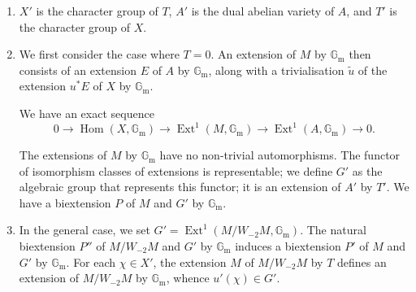     
 \begin{enumerate}
      
 \item[(a)]
        \(X'\) is the character group of \(T\), \(A'\) is the dual abelian variety of \(A\), and \(T'\) is the character group of \(X\).
      


      
 \item[(b)]
        We first consider the case where \(T=0\).
        An extension of \(M\) by \(\mathbb {G}_\mathrm {m}\) then consists of an extension \(E\) of \(A\) by \(\mathbb {G}_\mathrm {m}\), along with a trivialisation \(\widetilde {u}\) of the extension \(u^*E\) of \(X\) by \(\mathbb {G}_\mathrm {m}\).

        


        We have an exact sequence
        \[           0           \to  \operatorname {Hom}(X,\mathbb {G}_\mathrm {m})           \to  \operatorname {Ext}^1(M,\mathbb {G}_\mathrm {m})           \to  \operatorname {Ext}^1(A,\mathbb {G}_\mathrm {m})           \to  0.         \]

        The extensions of \(M\) by \(\mathbb {G}_\mathrm {m}\) have no non-trivial automorphisms.
        The functor of isomorphism classes of extensions is representable;
        we define \(G'\) as the algebraic group that represents this functor;
        it is an extension of \(A'\) by \(T'\).
        We have a biextension \(P\) of \(M\) and \(G'\) by \(\mathbb {G}_\mathrm {m}\).
      


      
 \item[(c)]
        In the general case, we set \(G'=\operatorname {Ext}^1(M/W_{-2}M,\mathbb {G}_\mathrm {m})\).
        The natural biextension \(P''\) of \(M/W_{-2}M\) and \(G'\) by \(\mathbb {G}_\mathrm {m}\) induces a biextension \(P'\) of \(M\) and \(G'\) by \(\mathbb {G}_\mathrm {m}\).
        For each \(\chi \in  X'\), the extension \(M\) of \(M/W_{-2}M\) by \(T\) defines an extension of \(M/W_{-2}M\) by \(\mathbb {G}_\mathrm {m}\), whence \(u'(\chi )\in  G'\).

        



\end{enumerate}
